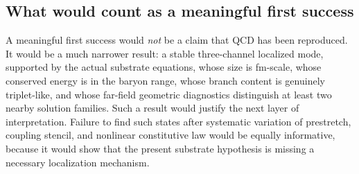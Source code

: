 \subsection{What would count as a meaningful first success}

A meaningful first success would \emph{not} be a claim that QCD has been reproduced.
It would be a much narrower result:
a stable three-channel localized mode, supported by the actual substrate equations, whose size is fm-scale, whose conserved energy is in the baryon range, whose branch content is genuinely triplet-like, and whose far-field geometric diagnostics distinguish at least two nearby solution families.
Such a result would justify the next layer of interpretation.
Failure to find such states after systematic variation of prestretch, coupling stencil, and nonlinear constitutive law would be equally informative, because it would show that the present substrate hypothesis is missing a necessary localization mechanism.
